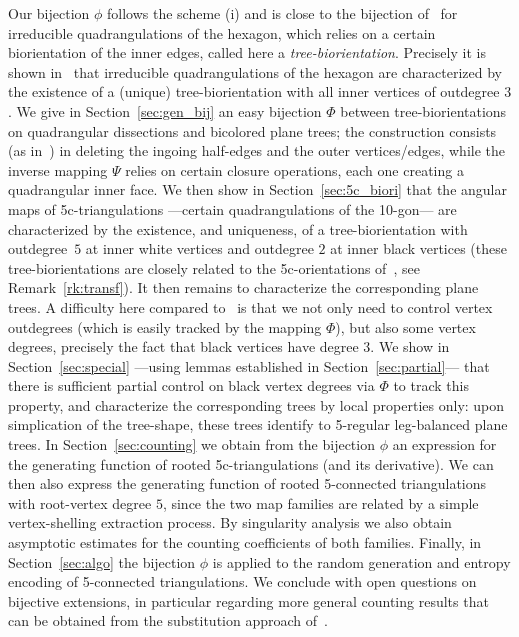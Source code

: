 \documentclass[letter]{amsart}
\numberwithin{theo}{section}
\theoremstyle{remark}
\begin{document}
 Our bijection $\phi$ follows the scheme (i) and is close to the bijection of~\cite{FuPoScL} for irreducible quadrangulations of the hexagon, which relies 
 on a certain biorientation of the inner edges, called here a \emph{tree-biorientation}.  Precisely it is shown in~\cite{FuPoScL} that irreducible quadrangulations of the hexagon are characterized by the existence of a (unique) tree-biorientation with all inner vertices of outdegree $3$.    
We give in Section~\ref{sec:gen_bij} an easy bijection $\Phi$   
between tree-biorientations on quadrangular dissections and bicolored plane trees; the construction consists (as in~\cite{FuPoScL}) in deleting the ingoing half-edges and the outer vertices/edges, while the inverse mapping $\Psi$ relies on certain closure operations, each one  creating a quadrangular inner face.  
We then show in Section~\ref{sec:5c_biori} that the angular maps of 5c-triangulations ---certain quadrangulations of the 10-gon--- are characterized by the existence, and uniqueness, of a tree-biorientation with outdegree~$5$ at inner white vertices and outdegree $2$ at inner black vertices (these tree-biorientations are closely related to the 5c-orientations of~\cite{BernardiFL23}, see Remark~\ref{rk:transf}). It then remains to characterize the corresponding plane trees. A difficulty here compared to~\cite{FuPoScL} is that we not only need to control vertex outdegrees (which is easily tracked by the mapping $\Phi$), but also some vertex degrees, precisely 
the fact that black vertices have degree 3. 
We show in Section~\ref{sec:special} ---using lemmas established in Section~\ref{sec:partial}---  that there is sufficient partial control on black vertex degrees via $\Phi$ to track this property, and characterize the  corresponding trees by local properties only: upon simplication of the tree-shape, these trees identify to 5-regular leg-balanced plane trees. 
In Section~\ref{sec:counting} we obtain from the bijection $\phi$ an expression for the generating function of rooted 5c-triangulations (and its derivative). We can then also express the generating function of rooted 5-connected triangulations with root-vertex degree $5$, since the two map families  are related by a simple vertex-shelling extraction process. By singularity analysis we also obtain asymptotic estimates for the counting coefficients of both families.
Finally, in Section~\ref{sec:algo} the bijection $\phi$ is applied to the random generation and entropy encoding of 5-connected triangulations. We conclude with open questions on bijective extensions, in particular regarding more general counting results that can be obtained from the substitution approach of~\cite{gao2001}.  
\end{document}
